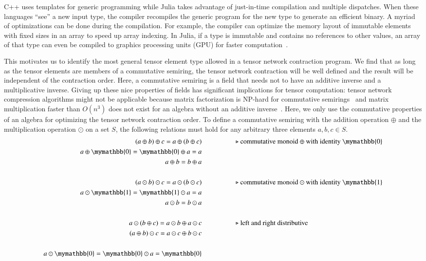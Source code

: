 \documentclass[onefignum, onetabnum]{siamart190516}
\newcommand{\<}{\langle}
\renewcommand{\>}{\rangle}
\newcounter{example}
\begin{document}
C++ uses templates for generic programming while Julia takes advantage of just-in-time compilation and multiple dispatches.
When these languages ``see'' a new input type, the compiler recompiles the generic program for the new type to generate an efficient binary.
A myriad of optimizations can be done during the compilation. For example, the compiler can optimize the memory layout of immutable elements with fixed sizes in an array to speed up array indexing.
In Julia, if a type is immutable and contains no references to other values, an array of that type can even be compiled to graphics processing units (GPU) for faster computation~\cite{Besard2018}.

This motivates us to identify the most general tensor element type allowed in a tensor network contraction program.
We find that as long as the tensor elements are members of a commutative semiring, the tensor network contraction will be well defined and the result will be independent of the contraction order.
Here, a commutative semiring is a field that needs not to have an additive inverse and a multiplicative inverse.
Giving up these nice properties of fields has significant implications for tensor computation: tensor network compression algorithms might not be applicable because matrix factorization is NP-hard for commutative semirings~\cite{Shitov2014} and matrix multiplication faster than $O(n^3)$ does not exist for an algebra without an additive inverse~\cite{Kerr1970}.
Here, we only use the commutative properties of an algebra for optimizing the tensor network contraction order.
To define a commutative semiring with the addition operation $\oplus$ and the multiplication operation $\odot$ on a set $S$, the following relations must hold for any arbitrary three elements $a, b, c \in S$.
\begin{align*}
(a \oplus b) \oplus c = a \oplus (b \oplus c) & \hspace{5em}\text{$\triangleright$ commutative monoid $\oplus$ with identity $\mymathbb{0}$}\\
a \oplus \mymathbb{0} = \mymathbb{0} \oplus a = a &\\
a \oplus b = b \oplus a &\\
&\\
(a \odot b) \odot c = a \odot (b \odot c)  &   \hspace{5em}\text{$\triangleright$ commutative monoid $\odot$ with identity $\mymathbb{1}$}\\
a \odot  \mymathbb{1} =  \mymathbb{1} \odot a = a &\\
a \odot b = b \odot a &\\
&\\
a \odot (b\oplus c) = a\odot b \oplus a\odot c  &  \hspace{5em}\text{$\triangleright$ left and right distributive}\\
(a\oplus b) \odot c = a\odot c \oplus b\odot c &\\
&\\
a \odot \mymathbb{0} = \mymathbb{0} \odot a = \mymathbb{0}
\end{align*}
\end{document}
